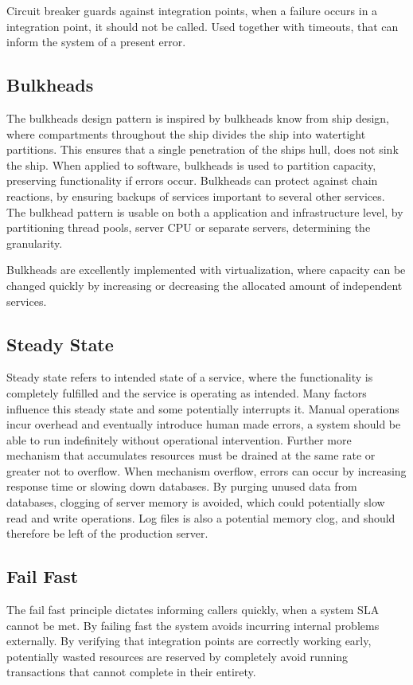 Circuit breaker guards against integration points, when a failure occurs in a integration point, it should not be called. Used together with timeouts, that can inform the system of a present error.



\subsection{Bulkheads}
The bulkheads design pattern is inspired by bulkheads know from ship design, where compartments throughout the ship divides the ship into watertight partitions. This ensures that a single penetration of the ships hull, does not sink the ship. When applied to software, bulkheads is used to partition capacity, preserving functionality if errors occur. Bulkheads can protect against chain reactions, by ensuring backups of services important to several other services. The bulkhead pattern is usable on both a application and infrastructure level, by partitioning thread pools, server CPU or separate servers, determining the granularity. 


Bulkheads are excellently implemented with virtualization, where capacity can be changed quickly by increasing or decreasing the allocated amount of independent services.


\subsection{Steady State}
Steady state refers to intended state of a service, where the functionality is completely fulfilled and the service is operating as intended. Many factors influence this steady state and some potentially interrupts it. Manual operations incur overhead and eventually introduce human made errors, a system should be able to run indefinitely without operational intervention.  Further more mechanism that accumulates resources must be drained at the same rate or greater not to overflow. When mechanism overflow, errors can occur by increasing response time or slowing down databases. By purging unused data from databases, clogging of server memory is avoided, which could potentially slow read and write operations. Log files is also a potential memory clog, and should therefore be left of the production server.


\subsection{Fail Fast}
The fail fast principle dictates informing callers quickly, when a system SLA cannot be met. By failing fast the system avoids incurring internal problems externally. By verifying that integration points are correctly working early, potentially wasted resources are reserved by completely avoid running transactions that cannot complete in their entirety.

